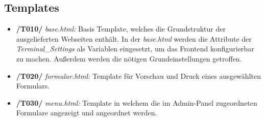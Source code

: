 \vspace{1,5cm}

\subsection{Templates}
\begin{itemize}
    \item \textbf{/T010/} \textit{base.html:} Basis Template, welches die Grundstruktur der ausgelieferten Webseiten enthält. In der \textit{base.html} werden die Attribute der \textit{Terminal\_Settings} als Variablen eingesetzt, um das Frontend konfigurierbar zu machen. Außerdem werden die nötigen Grundeinstellungen getroffen.
    \item \textbf{/T020/} \textit{formular.html:} Template für Vorschau und Druck eines ausgewählten Formulars.
    \item \textbf{/T030/} \textit{menu.html:} Template in welchem die im Admin-Panel zugeordneten Formulare angezeigt und angeordnet werden.
\end{itemize}
\newpage
